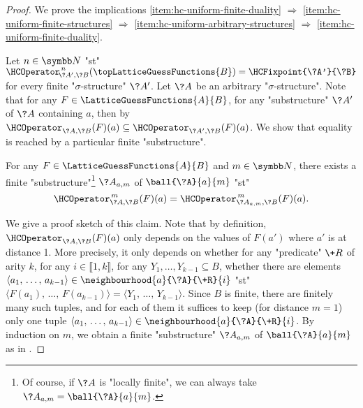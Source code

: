 \begin{proof}
	We prove the implications
	\eqref{item:hc-uniform-finite-duality} $\Rightarrow$
	\eqref{item:hc-uniform-finite-structures} $\Rightarrow$
	\eqref{item:hc-uniform-arbitrary-structures} $\Rightarrow$
	\eqref{item:hc-uniform-finite-duality}.
	
	Let $n\in \N$ "st" $\HCOperator^{\,n}_{\!\?A',\?B}(\topLatticeGuessFunctions{B}) = \HCFixpoint{\?A'}{\?B}$ for every finite "$\sigma$-structure" $\?A'$. Let $\?A$ be an arbitrary
	"$\sigma$-structure". Note that for any $F\in \LatticeGuessFunctions{A}{B}$, for any 
	"substructure" $\?A'$ of $\?A$ containing $a$, then by 
	$\HCOperator_{\?A,\?B}(F)(a) \subseteq \HCOperator_{\?A',\?B}(F)(a)$.
	We show that equality is reached by a particular finite "substructure".
	\begin{claim}
		\label{claim:hyperedge-consistency-ball}
		For any $F\in \LatticeGuessFunctions{A}{B}$ and $m\in \N$,
		there exists a finite "substructure"\footnote{Of course, if $\?A$ is "locally finite",
		we can always take $\?A_{a,m} = \ball{\?A}{a}{m}$.}
		$\?A_{a,m}$ of $\ball{\?A}{a}{m}$ "st"
		\[\HCOperator^{\,m}_{\?A,\?B}(F)(a) = \HCOperator^{\,m}_{\?A_{a,m},\?B}(F)(a).\]
	\end{claim}
	We give a proof sketch of this claim. Note that by definition,
	$\HCOperator_{\?A,\?B}(F)(a)$ only depends on the values of $F(a')$ where $a'$ is at distance 1.
	More precisely, it only depends on whether for any "predicate" $\+R$ of arity $k$,
	for any $i\in\lBrack 1,k\rBrack$, for any $Y_1,\hdots,Y_{k-1} \subseteq B$, whether there
	are elements $\langle a_1,\,\hdots,\,a_{k-1}\rangle \in \neighbourhood{a}{\?A}{\+R}{i}$
	"st"  
	$\langle F(a_1),\,\hdots,\,F(a_{k-1}) \rangle = \langle Y_1,\,\hdots,\,Y_{k-1} \rangle$.
	Since $B$ is finite, there are finitely many such tuples, and for each of them it suffices
	to keep (for distance $m=1$) only one tuple $\langle a_1,\,\hdots,\,a_{k-1}\rangle \in \neighbourhood{a}{\?A}{\+R}{i}$. By induction on $m$, we
	obtain a finite "substructure" $\?A_{a,m}$ of $\ball{\?A}{a}{m}$ as in
	.


\end{proof}

